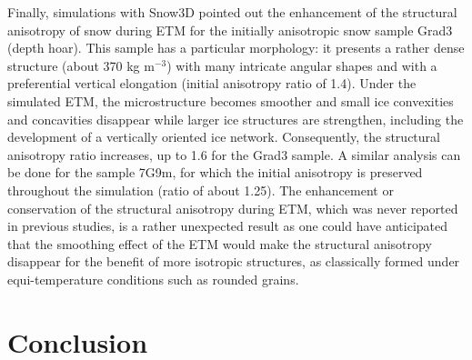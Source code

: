 \documentclass[draft,ms]{agujournal2019}
\begin{document}

Finally, simulations with Snow3D pointed out the enhancement of the structural anisotropy of snow during ETM for the initially anisotropic snow sample Grad3 (depth hoar). This sample has a particular morphology: it presents a rather dense structure (about 370 kg m$^{-3}$) with many intricate angular shapes and with a preferential vertical elongation (initial anisotropy ratio of 1.4).
Under the simulated ETM, the microstructure becomes smoother and small ice convexities and concavities disappear while larger ice structures are strengthen, including the development of a vertically oriented ice network. Consequently, the structural anisotropy ratio increases, up to 1.6 for the Grad3 sample. A similar analysis can be done for the sample 7G9m, for which the initial anisotropy is preserved throughout the simulation (ratio of about 1.25). The enhancement or conservation of the structural anisotropy during ETM, which was never reported in previous studies, is a rather unexpected result as one could have anticipated that the smoothing effect of the ETM would make the structural anisotropy disappear for the benefit of more isotropic structures, as classically formed under equi-temperature conditions such as rounded grains. %

\section{Conclusion}
\label{sec:conclusion}
\end{document}
